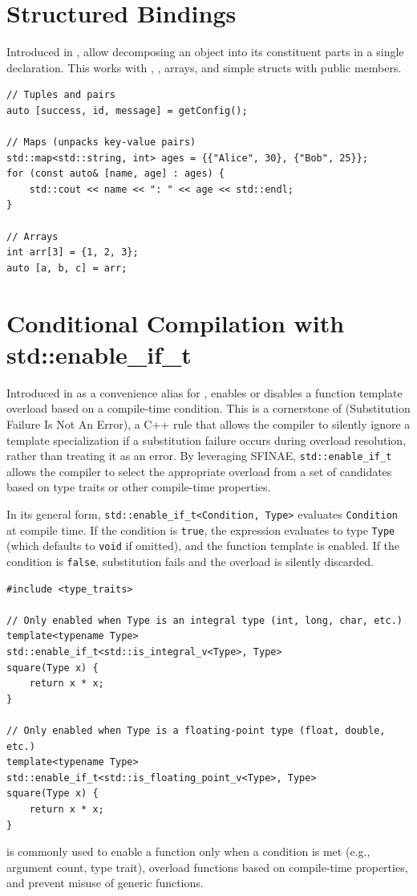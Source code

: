 \section{Structured Bindings}
Introduced in ,  allow decomposing an object into its constituent parts in a single declaration. This works with , , arrays, and simple structs with public members.
\begin{lstlisting}
// Tuples and pairs
auto [success, id, message] = getConfig();

// Maps (unpacks key-value pairs)
std::map<std::string, int> ages = {{"Alice", 30}, {"Bob", 25}};
for (const auto& [name, age] : ages) {
    std::cout << name << ": " << age << std::endl;
}

// Arrays
int arr[3] = {1, 2, 3};
auto [a, b, c] = arr;
\end{lstlisting}








\section{Conditional Compilation with std::enable\_if\_t}
Introduced in  as a convenience alias for ,  enables or disables a function template overload based on a compile-time condition. This is a cornerstone of  (Substitution Failure Is Not An Error), a C++ rule that allows the compiler to silently ignore a template specialization if a substitution failure occurs during overload resolution, rather than treating it as an error. By leveraging SFINAE, \texttt{std::enable\_if\_t} allows the compiler to select the appropriate overload from a set of candidates based on type traits or other compile-time properties.

In its general form, \texttt{std::enable\_if\_t<Condition, Type>} evaluates \texttt{Condition} at compile time. If the condition is \texttt{true}, the expression evaluates to type \texttt{Type} (which defaults to \texttt{void} if omitted), and the function template is enabled. If the condition is \texttt{false}, substitution fails and the overload is silently discarded.
\begin{lstlisting}
#include <type_traits>

// Only enabled when Type is an integral type (int, long, char, etc.)
template<typename Type>
std::enable_if_t<std::is_integral_v<Type>, Type>
square(Type x) {
    return x * x;
}

// Only enabled when Type is a floating-point type (float, double, etc.)
template<typename Type>
std::enable_if_t<std::is_floating_point_v<Type>, Type>
square(Type x) {
    return x * x;
}
\end{lstlisting}
 is commonly used to enable a function only when a condition is met (e.g., argument count, type trait), overload functions based on compile-time properties, and prevent misuse of generic functions.




